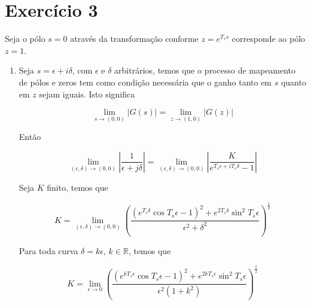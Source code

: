     \section*{Exercício 3}
    
    Seja o pólo $s=0$ através da transformação conforme $z = e^{T_s s}$ corresponde ao pólo $z = 1$.
    
        \begin{enumerate}
        
        \item %
        \label{item:ex3a}
        
         Seja $s = \epsilon + i \delta$, com $\epsilon$ e $\delta$ arbitrários, temos que o processo de mapeamento de pólos e zeros tem como condição necessária que o ganho tanto em $s$ quanto em $z$ sejam iguais. Isto significa 
        
            \begin{equation}
                 \lim\limits_{s \rightarrow (0, 0)} \left \lvert G(s) \right \rvert = \lim\limits_{z \rightarrow (1, 0)} \left \lvert G(z) \right \rvert
            \label{eq:limitcond}
            \end{equation}
        
        Então 
        
            \begin{equation}
                \lim\limits_{(\epsilon, \delta) \rightarrow (0, 0)} \left \lvert \frac{1}{\epsilon + j \delta} \right \rvert = \lim\limits_{(\epsilon, \delta) \rightarrow (0, 0)} \left \lvert \frac{K}{e^{T_s \epsilon + i T_s \delta} - 1} \right \rvert
            \end{equation}
        
        Seja $K$ finito, temos que 
        
            \begin{equation*}
                K = \lim\limits_{(\epsilon, \delta) \rightarrow (0, 0)} \left( \frac{(e^{T_s \delta} \cos{T_s \epsilon}  - 1)^2 + e^{2 T_s \delta} \sin^2 T_s \epsilon}{\epsilon^2 + \delta^2} \right)^{\frac{1}{2}}
            \end{equation*}
        
        Para toda curva $\delta = k \epsilon$, $k \in \mathbb{R}$, temos que 
        
            \begin{equation*}
                K = \lim\limits_{\epsilon \rightarrow 0} \left( \frac{(e^{k T_s \epsilon} \cos{T_s \epsilon}  - 1)^2 + e^{2 k T_s \epsilon} \sin^2 T_s \epsilon}{\epsilon^2(1 + k^2)} \right)^{\frac{1}{2}}
            \end{equation*}
        

\end{enumerate}
